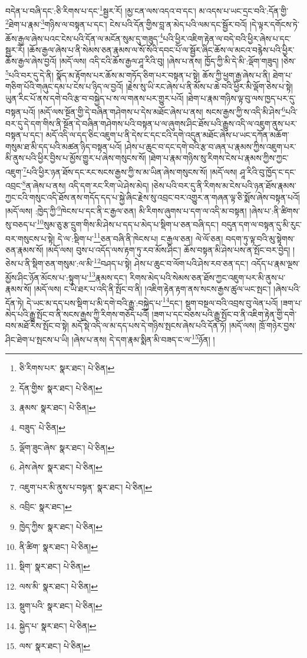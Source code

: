 བདེན་པ་བཞི་དང་:ཅི་རིགས་པ་དང་\footnote{ཅི་རིགས་པར་  སྣར་ཐང་།  པེ་ཅིན། }སྦྱར་རོ། །མྱ་ངན་ལས་འདའ་བ་དང་། མ་འདས་པ་ཡང་དྲང་བའི་:དོན་གྱི་\footnote{དོན་གྱིས་  སྣར་ཐང་།  པེ་ཅིན། }ཐེག་པ་རྣམ་\footnote{རྣམས་  སྣར་ཐང་།  པེ་ཅིན། }གཉིས་ལ་བསྟན་པ་དང་། ངེས་པའི་དོན་གྱིས་བླ་ན་མེད་པའི་ལམ་དང་སྦྱོར་བའོ། །དེ་ལྟར་དགོངས་ཏེ་ཆོས་རྒྱལ་ཞེས་པའང་ངེས་པའི་དོན་ལ་མངོན་སུམ་དུ་གཟུད་\footnote{བཟུད་  པེ་ཅིན། }པའི་ཕྱིར་འཇིག་རྟེན་ལ་བདེ་བའི་ཕྱིར་ཞེས་པ་དང་སྦྱར་རོ། །ཆོས་རྒྱལ་ཞེས་པ་ནི་སེམས་ཅན་རྣམས་ལ་སོ་སོའི་དབང་པོ་ལ་སྦྱོར་ཞིང་ཆོས་ལ་མངའ་བརྙེས་པའི་ཕྱིར་ཆོས་རྒྱལ་ཞེས་བྱའོ། །མདོ་ལས། འདི་ངའི་ཆོས་རྒྱལ་ཤཱ་རིའི་བུ། །ཞེས་པ་ནས། ཁྱོད་ཀྱི་མི་དེ་མི་:ལྡོག་གཟུད། །ཅེས་\footnote{ལྡོག་ཟུང་ཞེས་  སྣར་ཐང་།  པེ་ཅིན། }པའི་བར་དུ་དེ་ནི། སྣོད་མ་རྟོགས་པར་ཆོས་མ་གཏོད་ཅིག་པར་བསྟན་པ་སྟེ། ཆོས་ཀྱི་ཕྱག་རྒྱ་ཞེས་པ་ནི། ཐེག་པ་གཅིག་པོའི་གཞུང་དམ་པ་ངེས་པ་ཉིད་ལ་བྱའོ། །རྗེས་སུ་ཡི་རང་ཞེས་པ་ནི་མོས་པ་ཆེ་བའི་ཕྱིར་མི་ལྡོག་ཅེས་པ་སྟེ། ཡུན་རིང་པོ་ནས་དགེ་བའི་རྩ་བ་བསྐྱེད་པ་ས་ལ་གནས་པར་གྱུར་པའོ། །ཐེག་པ་རྣམ་གཉིས་ལྟ་བུ་ལས་ཁྱད་པར་དུ་བསྟན་པའོ། །མདོ་ལས་སྔོན་གྱི་དེ་བཞིན་གཤེགས་པ་དེས་མཐོང་ཞེས་པ་ནས། སངས་རྒྱས་ཀྱི་ས་འདི་མི་ཤེས་\footnote{ཤེས་ཞེས་  སྣར་ཐང་།  པེ་ཅིན། }པའི་བར་དུ་དེ་དག་གིས་ནི་སྔོན་དེ་བཞིན་གཤེགས་པའི་བསྟན་པ་ལ་ཞུགས་ཤིང་ཐོས་པའི་རྒྱུས་འདི་ལ་འཇུག་ནུས་པར་བསྟན་པ་དང་། མདོ་འདི་ལ་དད་ཅིང་འཇུག་པ་ནི་དེས་ང་དང་ངའི་དགེ་འདུན་མཐོང་ཞེས་པ་ཡང་དཀོན་མཆོག་གསུམ་ཐ་མི་དད་པའི་མཚན་ཉིད་བསྟན་པའོ། །ཤེས་པ་ཆུང་བ་དང་དགེ་བའི་རྩ་བ་ཞན་པ་རྣམས་ཀྱིས་འཇུག་པར་མི་ནུས་པའི་ཕྱིར་བྱིས་པ་མྱོས་གྱུར་པ་ཞེས་གསུངས་སོ། །ཐེག་པ་རྣམ་གཉིས་སུ་རིགས་ངེས་པ་རྣམས་ཀྱིས་ཀྱང་འཇུག་\footnote{འཇུག་པར་མི་ནུས་པ་བསྟན་  སྣར་ཐང་།  པེ་ཅིན། }པའི་ཕྱིར་ཉན་ཐོས་དང་རང་སངས་རྒྱས་ཀྱི་ས་མ་ཡིན་ཞེས་གསུངས་སོ། །མདོ་ལས། ཤཱ་རིའི་བུ་ཁྱོད་ང་དང་འབྲང་\footnote{འབྲིང་  སྣར་ཐང་། }ན་ཞེས་པ་ནས། འདི་དག་རང་རིག་ཡེ་ཤེས་མེད། །ཅེས་པའི་བར་དུ་ནི་རིགས་མ་ངེས་པའི་ཉན་ཐོས་རྣམས་ཀྱང་ངའི་གསུང་འདི་ཐོས་ནས་གདོད་དད་པ་སྐྱེ་ཞིང་རྗེས་སུ་འབྲང་བར་འགྱུར་ན་གཞན་ལྟ་ཅི་སྨོས་ཞེས་བསྟན་པའོ། །མདོ་ལས། :ཁྱེད་ཀྱི་\footnote{ཁྱེད་ཀྱིས་  སྣར་ཐང་།  པེ་ཅིན། }ཁེངས་པ་དང་ནི་ང་རྒྱལ་ཅན། མི་རིགས་ཞུགས་པ་དག་ལ་འདི་མ་བསྟན། །ཞེས་པ་:ནི་ཚིགས་སུ་བཅད་པ་\footnote{ནི་ཚིག་  སྣར་ཐང་།  པེ་ཅིན། }སུམ་ཅུ་རྩ་དྲུག་གིས་མི་ཤེས་པ་དད་པ་མེད་པ་སྡིག་པ་ཅན་བཞི་དང་། བདུན་དག་ལ་བསྟན་དུ་མི་རུང་བར་གསུངས་པ་སྟེ། དེ་ལ་:སྡིག་པ་\footnote{སྡིག་  སྣར་ཐང་།  པེ་ཅིན། }ཅན་བཞི་ནི་ཁེངས་པ། ང་རྒྱལ་ཅན། ལེ་ལོ་ཅན། བདག་ཏུ་ལྟ་བའི་མུ་སྟེགས་ཅན་རྣམས་སོ། །མདོ་ལས། བུས་པ་འདོད་ལས་རྟག་ཏུ་རབ་མོས་ཤིང་། ཆོས་བསྟན་མི་ཤེས་པས་ན་སྤོང་བར་བྱེད། །ཅེས་པ་ནི་སྡིག་ཅན་གསུམ་:ལ་མི་\footnote{ལས་མི་  སྣར་ཐང་།  པེ་ཅིན། }བཤད་པ་སྟེ། ཤེས་པ་ཆུང་བ་ལོག་པའི་ཤེས་རབ་ཅན་དང་། འདོད་པ་རྣམ་ལྔས་མྱོས་ཤིང་ཉོན་མོངས་པ་:སྟུག་པ་\footnote{སྡུག་པའི་  སྣར་ཐང་།  པེ་ཅིན། }རྣམས་དང་། རིགས་མེད་པའི་སེམས་ཅན་ཐོས་ཀྱང་འཇུག་པར་མི་ནུས་པ་རྣམས་སོ། །མདོ་ལས། ང་ཡི་ཐར་པ་འདི་ནི་སྤོང་བ་ནི། །འཇིག་རྟེན་རྟག་ནས་སངས་རྒྱས་ཚུལ་ཡང་སྤང་། །ཞེས་པའི་དོན་ཏེ། དེ་ཡང་མ་དད་པས་སྡིག་པ་མི་དགེ་བའི་རྒྱུ་:བསྐྱེད་པ་\footnote{སྐྱེད་པ་  སྣར་ཐང་།  པེ་ཅིན། }དང་། སྡུག་བསྔལ་བའི་འབྲས་བུ་ལེན་པའོ། །ཟག་པ་མེད་པའི་རྒྱུ་སྤོང་བ་ནི་སངས་རྒྱས་ཀྱི་རིགས་གཅོད་པའོ། །ཟག་པ་དང་བཅས་པའི་རྒྱུ་སྤོང་བ་ནི་འཇིག་རྟེན་གྱི་དགེ་བས་མཐོ་རིས་སྤོང་བ་སྟེ། མདོ་སྡེ་འདི་ལ་མ་དད་པས་དེ་གཉིས་སྤངས་ཞེས་པའི་དོན་ཏོ། །མདོ་ལས། ཁྲོ་གཉེར་བྱས་ཤིང་ཐེག་པ་སྤངས་པ་ཡི། །ཞེས་པ་ནས། དེ་དག་རྣམ་སྨིན་མི་བཟད་ང་ལ་\footnote{ལས་  སྣར་ཐང་།  པེ་ཅིན། }ཉོན། །
